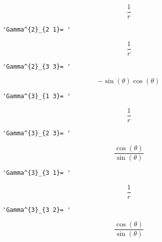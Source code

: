\documentclass[11pt]{article}
\begin{document}
    
    \[\frac{1}{r}\]

    
    
    \begin{verbatim}
'Gamma^{2}_{2 1}= '
    \end{verbatim}

    
    \[\frac{1}{r}\]

    
    
    \begin{verbatim}
'Gamma^{2}_{3 3}= '
    \end{verbatim}

    
    \[- \sin{\left (\theta \right )} \cos{\left (\theta \right )}\]

    
    
    \begin{verbatim}
'Gamma^{3}_{1 3}= '
    \end{verbatim}

    
    \[\frac{1}{r}\]

    
    
    \begin{verbatim}
'Gamma^{3}_{2 3}= '
    \end{verbatim}

    
    \[\frac{\cos{\left (\theta \right )}}{\sin{\left (\theta \right )}}\]

    
    
    \begin{verbatim}
'Gamma^{3}_{3 1}= '
    \end{verbatim}

    
    \[\frac{1}{r}\]

    
    
    \begin{verbatim}
'Gamma^{3}_{3 2}= '
    \end{verbatim}

    
    \[\frac{\cos{\left (\theta \right )}}{\sin{\left (\theta \right )}}\]
\end{document}
